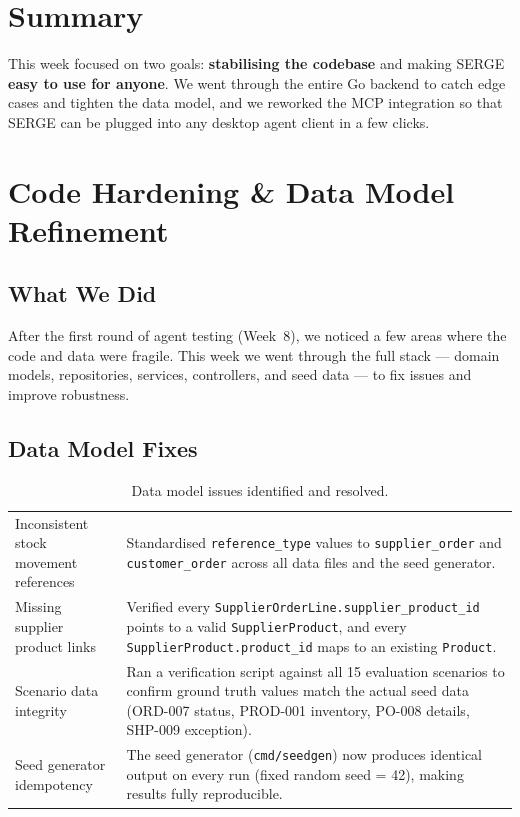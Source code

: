\documentclass[11pt,a4paper]{article}
\begin{document}
\section{Summary}

This week focused on two goals: \textbf{stabilising the codebase} and making SERGE \textbf{easy to use for anyone}. We went through the entire Go backend to catch edge cases and tighten the data model, and we reworked the MCP integration so that SERGE can be plugged into any desktop agent client in a few clicks.

\section{Code Hardening \& Data Model Refinement}

\subsection{What We Did}

After the first round of agent testing (Week~8), we noticed a few areas where the code and data were fragile. This week we went through the full stack --- domain models, repositories, services, controllers, and seed data --- to fix issues and improve robustness.

\subsection{Data Model Fixes}

\begin{table}[H]
\centering\small
\caption{Data model issues identified and resolved.}
\begin{tabularx}{\textwidth}{@{} L{4cm} X @{}}
\toprule
{} &  \\
\midrule
Inconsistent stock movement references & Standardised \texttt{reference\_type} values to \texttt{supplier\_order} and \texttt{customer\_order} across all data files and the seed generator. \\
Missing supplier product links & Verified every \texttt{SupplierOrderLine.supplier\_product\_id} points to a valid \texttt{SupplierProduct}, and every \texttt{SupplierProduct.product\_id} maps to an existing \texttt{Product}. \\
Scenario data integrity & Ran a verification script against all 15 evaluation scenarios to confirm ground truth values match the actual seed data (ORD-007 status, PROD-001 inventory, PO-008 details, SHP-009 exception). \\
Seed generator idempotency & The seed generator (\texttt{cmd/seedgen}) now produces identical output on every run (fixed random seed = 42), making results fully reproducible. \\
\bottomrule
\end{tabularx}
\end{table}
\end{document}
